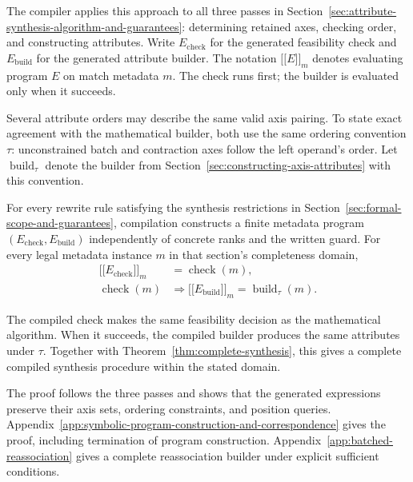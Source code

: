The compiler applies this approach to all three passes in
Section~\ref{sec:attribute-synthesis-algorithm-and-guarantees}:
determining retained axes, checking order, and constructing attributes.
Write $E_{\mathrm{check}}$ for the generated feasibility check and
$E_{\mathrm{build}}$ for the generated attribute builder.
The notation $\lbrack\!\lbrack E\rbrack\!\rbrack_m$ denotes evaluating
program $E$ on match metadata $m$.
The check runs first; the builder is evaluated only when it succeeds.

Several attribute orders may describe the same valid axis pairing.
To state exact agreement with the mathematical builder, both use the
same ordering convention $\tau$: unconstrained batch and contraction
axes follow the left operand's order.
Let $\operatorname{build}_{\tau}$ denote the builder from
Section~\ref{sec:constructing-axis-attributes} with this convention.

\begin{theorem}
\label{thm:symbolic-compilation}
For every rewrite rule satisfying the synthesis restrictions in
Section~\ref{sec:formal-scope-and-guarantees}, compilation constructs
a finite metadata program $(E_{\mathrm{check}},E_{\mathrm{build}})$
independently of concrete ranks and the written guard.
For every legal metadata instance $m$ in that section's completeness domain,
\begin{align}
 \lbrack\!\lbrack E_{\mathrm{check}}\rbrack\!\rbrack_m&=\operatorname{check}(m),
 \label{eq:emitted-check}\\
 \operatorname{check}(m)&\Rightarrow
 \lbrack\!\lbrack E_{\mathrm{build}}\rbrack\!\rbrack_m=\operatorname{build}_{\tau}(m).
 \label{eq:emitted-build}
\end{align}
\end{theorem}
The compiled check makes the same feasibility decision as the
mathematical algorithm. When it succeeds, the compiled builder produces
the same attributes under $\tau$.
Together with Theorem~\ref{thm:complete-synthesis}, this gives a complete
compiled synthesis procedure within the stated domain.

The proof follows the three passes and shows that the generated
expressions preserve their axis sets, ordering constraints, and position
queries. Appendix~\ref{app:symbolic-program-construction-and-correspondence}
gives the proof, including termination of program construction.
Appendix~\ref{app:batched-reassociation} gives a complete reassociation
builder under explicit sufficient conditions.

